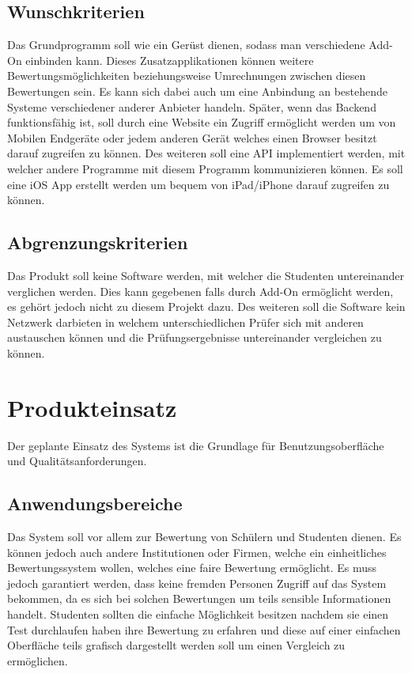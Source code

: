 \documentclass[a4paper,listof=leveldown,listof=numbered]{scrreprt}
\begin{document}
	\section{Wunschkriterien}
	Das Grundprogramm soll wie ein Gerüst dienen, sodass man verschiedene \acs{Add-On} einbinden kann. Dieses Zusatzapplikationen können weitere Bewertungsmöglichkeiten beziehungsweise Umrechnungen zwischen diesen Bewertungen sein. Es kann sich dabei auch um eine Anbindung an bestehende Systeme verschiedener anderer Anbieter handeln. Später, wenn das Backend funktionsfähig ist, soll durch eine Website ein Zugriff ermöglicht werden um von Mobilen Endgeräte oder jedem anderen Gerät welches einen Browser besitzt darauf zugreifen zu können. Des weiteren soll eine \ac{API} implementiert werden, mit welcher andere Programme mit diesem Programm kommunizieren können. Es soll eine iOS App erstellt werden um bequem von iPad/iPhone darauf zugreifen zu können.
	
	\section{Abgrenzungskriterien}
	Das Produkt soll keine Software werden, mit welcher die Studenten untereinander verglichen werden. Dies kann gegebenen falls durch \acs{Add-On} ermöglicht werden, es gehört jedoch nicht zu diesem Projekt dazu. Des weiteren soll die Software kein Netzwerk darbieten in welchem unterschiedlichen Prüfer sich mit anderen austauschen können und die Prüfungsergebnisse untereinander vergleichen zu können.
	
\chapter{Produkteinsatz}
	Der geplante Einsatz des Systems ist die Grundlage für Benutzungsoberfläche und Qualitätsanforderungen.
	
	\section{Anwendungsbereiche}
	Das System soll vor allem zur Bewertung von Schülern und Studenten dienen. Es können jedoch auch andere Institutionen oder Firmen, welche ein einheitliches Bewertungssystem wollen, welches eine faire Bewertung ermöglicht. Es muss jedoch garantiert werden, dass keine fremden Personen Zugriff auf das System bekommen, da es sich bei solchen Bewertungen um teils sensible Informationen handelt. Studenten sollten die einfache Möglichkeit besitzen nachdem sie einen Test durchlaufen haben ihre Bewertung zu erfahren und diese auf einer einfachen Oberfläche teils grafisch dargestellt werden soll um einen Vergleich zu ermöglichen.
	
\end{document}
